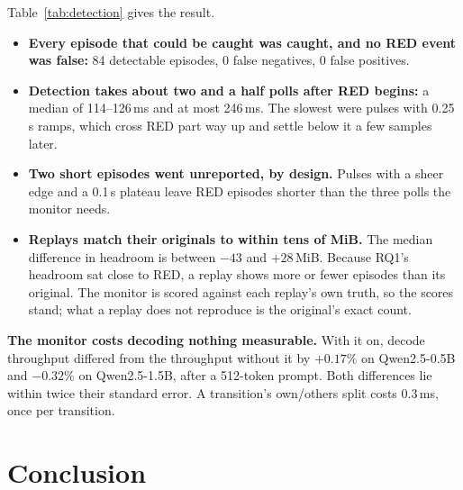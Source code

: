 \documentclass[11pt]{article}
\begin{document}
Table~\ref{tab:detection} gives the result.
\begin{itemize}
\item \textbf{Every episode that could be caught was caught, and no RED event
was false:} 84 detectable episodes, 0 false negatives, 0 false positives.
\item \textbf{Detection takes about two and a half polls after RED begins:} a
median of 114--126\,ms and at most 246\,ms. The slowest were pulses with
0.25\,s ramps, which cross RED part way up and settle below it a few samples
later.
\item \textbf{Two short episodes went unreported, by design.} Pulses with a
sheer edge and a 0.1\,s plateau leave RED episodes shorter than the three
polls the monitor needs.
\item \textbf{Replays match their originals to within tens of MiB.} The median
difference in headroom is between $-43$ and $+28$\,MiB. Because RQ1's headroom
sat close to RED, a replay shows more or fewer episodes than its original. The
monitor is scored against each replay's own truth, so the scores stand; what a
replay does not reproduce is the original's exact count.
\end{itemize}

\textbf{The monitor costs decoding nothing measurable.} With it on, decode
throughput differed from the throughput without it by $+0.17\%$ on
Qwen2.5-0.5B and $-0.32\%$ on Qwen2.5-1.5B, after a 512-token prompt. Both
differences lie within twice their standard error. A transition's own/others
split costs 0.3\,ms, once per transition.


\section{Conclusion}
\label{sec:conclusion}



\end{document}
